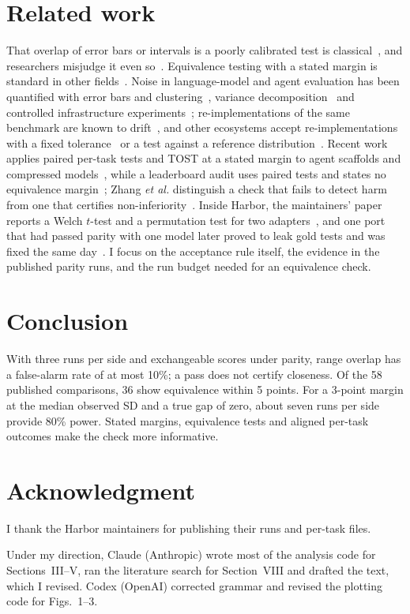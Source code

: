 \documentclass[conference]{IEEEtran}
\begin{document}
\section{Related work}

That overlap of error bars or intervals is a poorly calibrated test is classical~\cite{schenker_gentleman_2001,payton_2003}, and researchers misjudge it even so~\cite{belia_2005}. Equivalence testing with a stated margin is standard in other fields~\cite{schuirmann_1987,lakens_2017}. Noise in language-model and agent evaluation has been quantified with error bars and clustering~\cite{miller_error_bars}, variance decomposition~\cite{hardy_reliability} and controlled infrastructure experiments~\cite{segato_infra_noise}; re-implementations of the same benchmark are known to drift~\cite{biderman_lessons}, and other ecosystems accept re-implementations with a fixed tolerance~\cite{inspect_evals} or a test against a reference distribution~\cite{mlperf_training_rules}. Recent work applies paired per-task tests and TOST at a stated margin to agent scaffolds and compressed models~\cite{liu_han_harness,singh_compressed}, while a leaderboard audit uses paired tests and states no equivalence margin~\cite{liu_converged}; Zhang \emph{et al.} distinguish a check that fails to detect harm from one that certifies non-inferiority~\cite{zhang_upgrades}. Inside Harbor, the maintainers' paper reports a Welch $t$-test and a permutation test for two adapters~\cite{harbor_adapters}, and one port that had passed parity with one model later proved to leak gold tests and was fixed the same day~\cite{harbor_issue_1067}. I focus on the acceptance rule itself, the evidence in the published parity runs, and the run budget needed for an equivalence check.

\section{Conclusion}

With three runs per side and exchangeable scores under parity, range overlap has a false-alarm rate of at most 10\%; a pass does not certify closeness. Of the 58 published comparisons, 36 show equivalence within 5 points. For a 3-point margin at the median observed SD and a true gap of zero, about seven runs per side provide 80\% power. Stated margins, equivalence tests and aligned per-task outcomes make the check more informative.

\section*{Acknowledgment}
I thank the Harbor maintainers for publishing their runs and per-task files.

Under my direction, Claude (Anthropic) wrote most of the analysis code for Sections~III--V, ran the literature search for Section~VIII and drafted the text, which I revised. Codex (OpenAI) corrected grammar and revised the plotting code for Figs.~1--3.



\end{document}
